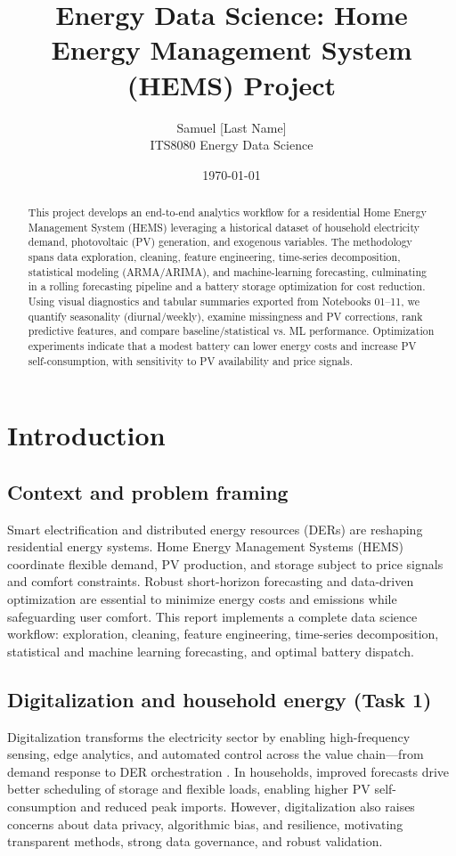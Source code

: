 \documentclass[12pt,a4paper]{article}
\title{\textbf{Energy Data Science: Home Energy Management System (HEMS) Project}}
\author{Samuel [Last Name]\\ITS8080 Energy Data Science}
\date{\today}
\begin{document}
\justifying
\maketitle
\thispagestyle{empty}

\begin{abstract}
This project develops an end-to-end analytics workflow for a residential Home Energy Management System (HEMS) leveraging a historical dataset of household electricity demand, photovoltaic (PV) generation, and exogenous variables. The methodology spans data exploration, cleaning, feature engineering, time-series decomposition, statistical modeling (ARMA/ARIMA), and machine-learning forecasting, culminating in a rolling forecasting pipeline and a battery storage optimization for cost reduction. Using visual diagnostics and tabular summaries exported from Notebooks 01--11, we quantify seasonality (diurnal/weekly), examine missingness and PV corrections, rank predictive features, and compare baseline/statistical vs. ML performance. Optimization experiments indicate that a modest battery can lower energy costs and increase PV self-consumption, with sensitivity to PV availability and price signals.
\end{abstract}

\clearpage
\tableofcontents
\listoffigures
\listoftables
\clearpage

\section{Introduction}
\subsection{Context and problem framing}
Smart electrification and distributed energy resources (DERs) are reshaping residential energy systems. Home Energy Management Systems (HEMS) coordinate flexible demand, PV production, and storage subject to price signals and comfort constraints. Robust short-horizon forecasting and data-driven optimization are essential to minimize energy costs and emissions while safeguarding user comfort. This report implements a complete data science workflow: exploration, cleaning, feature engineering, time-series decomposition, statistical and machine learning forecasting, and optimal battery dispatch.

\subsection{Digitalization and household energy (Task 1)}
Digitalization transforms the electricity sector by enabling high-frequency sensing, edge analytics, and automated control across the value chain---from demand response to DER orchestration \cite{IEA2017,Palensky2011}. In households, improved forecasts drive better scheduling of storage and flexible loads, enabling higher PV self-consumption and reduced peak imports. However, digitalization also raises concerns about data privacy, algorithmic bias, and resilience, motivating transparent methods, strong data governance, and robust validation.
\end{document}
